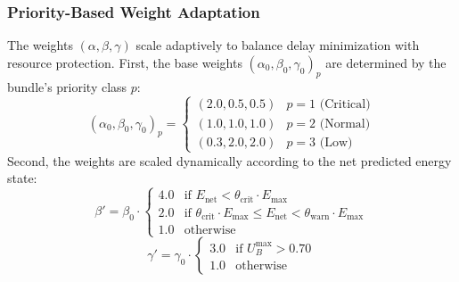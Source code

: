 \documentclass[journal,twocolumn]{IEEEtran}
\begin{document}
\subsubsection{Priority-Based Weight Adaptation}
The weights $(\alpha, \beta, \gamma)$ scale adaptively to balance delay minimization with resource protection. First, the base weights $(\alpha_0, \beta_0, \gamma_0)_p$ are determined by the bundle's priority class $p$:
\begin{equation}
    (\alpha_0, \beta_0, \gamma_0)_p = \begin{cases}
        (2.0, 0.5, 0.5) & p = 1 \text{ (Critical)} \\
        (1.0, 1.0, 1.0) & p = 2 \text{ (Normal)} \\
        (0.3, 2.0, 2.0) & p = 3 \text{ (Low)}
    \end{cases}
\end{equation}
Second, the weights are scaled dynamically according to the net predicted energy state:
\begin{equation}
    \beta' = \beta_0 \cdot \begin{cases}
        4.0 & \text{if } E_{\text{net}} < \theta_{\text{crit}} \cdot E_{\max} \\
        2.0 & \text{if } \theta_{\text{crit}} \cdot E_{\max} \leq E_{\text{net}} < \theta_{\text{warn}} \cdot E_{\max} \\
        1.0 & \text{otherwise}
    \end{cases}
\end{equation}
\begin{equation}
    \gamma' = \gamma_0 \cdot \begin{cases}
        3.0 & \text{if } U_B^{\max} > 0.70 \\
        1.0 & \text{otherwise}
    \end{cases}
\end{equation}
\end{document}
